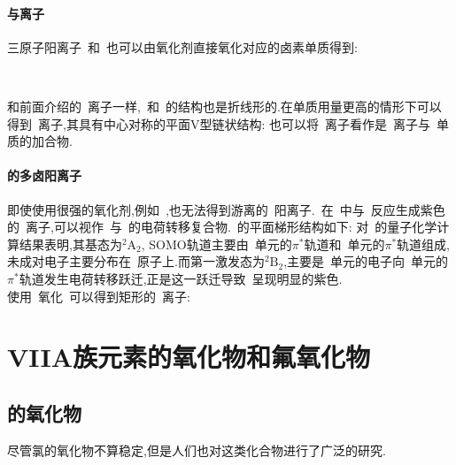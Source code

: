 \documentclass{ctexbook}
\begin{document}
\paragraph{与离子}
三原子阳离子~和~也可以由氧化剂直接氧化对应的卤素单质得到:
\begin{tightcenter}
    \\
\end{tightcenter}
和前面介绍的~离子一样,~和~的结构也是折线形的.在单质用量更高的情形下可以得到~离子,其具有中心对称的平面V型链状结构\cite{Apblett1986}:
\noindent 也可以将~离子看作是~离子与~单质的加合物.
\paragraph{的多卤阳离子}
即使使用很强的氧化剂,例如~\ce{[O2]+},也无法得到游离的~阳离子.~在~中与~\ce{[O2]+[SbF6]-}反应生成紫色的~\ce{[Cl2O2]+}离子\cite{Drews1999},可以视作~与~的电荷转移复合物.~\ce{[Cl2O2]+}的平面梯形结构如下:
\noindent 对~\ce{[Cl2O2]+}的量子化学计算结果表明,其基态为$^2\text{A}_2$, SOMO轨道主要由~单元的$\pi^\ast$轨道和~单元的$\pi^\ast$轨道组成,未成对电子主要分布在~原子上.而第一激发态为$^2\text{B}_2$,主要是~单元的电子向~单元的$\pi^\ast$轨道发生电荷转移跃迁,正是这一跃迁导致~\ce{[Cl2O2]+}呈现明显的紫色\cite{Drews1999}.\\
\indent 使用~氧化~可以得到矩形的~\ce{[Cl4]+}离子\cite{Seidel2000}:
\begin{tightcenter}
\end{tightcenter}

\section{VIIA族元素的氧化物和氟氧化物}
\subsection{的氧化物}
尽管氯的氧化物不算稳定,但是人们也对这类化合物进行了广泛的研究.
\end{document}
